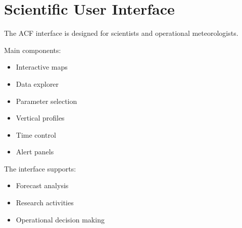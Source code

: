 \section{Scientific User Interface}


The ACF interface is designed for scientists and operational
meteorologists.



Main components:


\begin{itemize}

\item Interactive maps

\item Data explorer

\item Parameter selection

\item Vertical profiles

\item Time control

\item Alert panels

\end{itemize}



The interface supports:


\begin{itemize}

\item Forecast analysis

\item Research activities

\item Operational decision making

\end{itemize}
